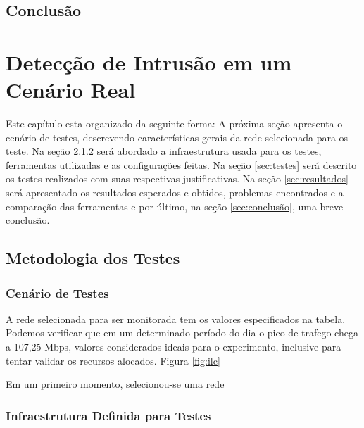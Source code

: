 \documentclass[
	12pt,				
	openright,		
	twoside,	
	a4paper,
	english,	
	brazil	
	]{abntex2}
\begin{document}
\section{Conclusão}

\chapter{Detecção de Intrusão em um Cenário Real}

Este capítulo esta organizado da seguinte forma: A próxima seção apresenta o cenário de testes, descrevendo características gerais da rede selecionada para os teste. Na seção \ref{sec:infraestrutura} será abordado a infraestrutura usada para os testes, ferramentas utilizadas e as configurações feitas. Na seção \ref{sec:testes} será descrito os testes realizados com suas respectivas justificativas. Na seção \ref{sec:resultados} será apresentado os resultados esperados e obtidos, problemas encontrados e a comparação das ferramentas e por último, na seção \ref{sec:conclusão}, uma breve conclusão.

\section{Metodologia dos Testes}
\subsection{Cenário de Testes} \label{sec:cenário}

A rede selecionada para ser monitorada tem os valores especificados na tabela. Podemos verificar que em um determinado período do dia o pico de trafego chega a 107,25 Mbps, valores considerados ideais para o experimento, inclusive para tentar validar os recursos alocados. Figura \ref{fig:ilc}

Em um primeiro momento, selecionou-se uma rede

\subsection{Infraestrutura Definida para Testes} \label{sec:infraestrutura}
\end{document}
